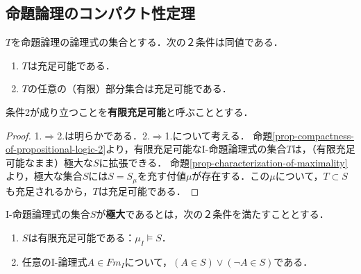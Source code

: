 \documentclass[uplatex, dvipdfmx]{jsreport}
\begin{document}
\subsection{命題論理のコンパクト性定理}
\begin{shadebox}
\begin{theorem}[命題論理のコンパクト性定理]
    $T$を命題論理の論理式の集合とする．次の２条件は同値である．
    \begin{enumerate}
        \item $T$は充足可能である．
        \item $T$の任意の（有限）部分集合は充足可能である．
    \end{enumerate}
    条件2が成り立つことを\textbf{有限充足可能}と呼ぶこととする．
\end{theorem}
\begin{proof}
    1.$\Rightarrow$2.は明らかである．2.$\Rightarrow$1.について考える．
    命題\ref{prop-compactness-of-propositional-logic-2}より，有限充足可能なI-命題論理式の集合$T$は，（有限充足可能なまま）極大な$S$に拡張できる．
    命題\ref{prop-characterization-of-maximality}より，極大な集合$S$には$S=S_\mu$を充す付値$\mu$が存在する．この$\mu$について，$T\subset S$も充足されるから，$T$は充足可能である．
\end{proof}
\end{shadebox}

\begin{definition}[maximal]
    I-命題論理式の集合$S$が\textbf{極大}であるとは，次の２条件を満たすこととする．
    \begin{enumerate}
        \item $S$は有限充足可能である：$\mu_I\vDash S$．
        \item 任意のI-論理式$A\in Fm_I$について，$(A\in S)\lor(\lnot A\in S)$である．
    \end{enumerate}
\end{definition}
\end{document}
